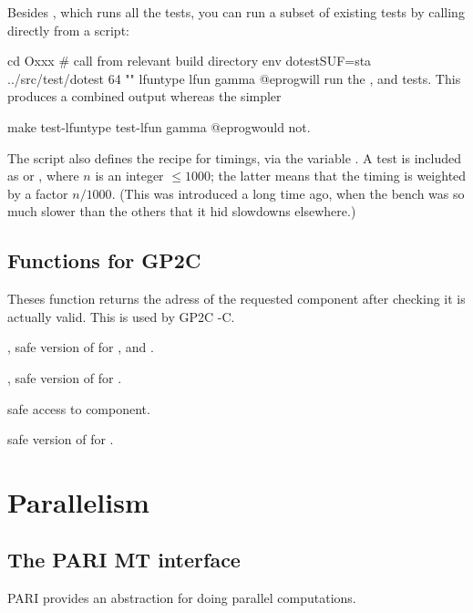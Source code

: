 \item Besides , which runs all the tests, you can run a
subset of existing tests by calling  directly from a script:

\bprog
  cd Oxxx     # call from relevant build directory
  env dotestSUF=sta ../src/test/dotest 64 "" lfuntype lfun gamma
@eprog\noindent will run the ,  and  tests.
This produces a combined output whereas the simpler

\bprog
  make test-lfuntype test-lfun gamma
@eprog\noindent would not.

\item The  script also defines the recipe for
 timings, via the variable . A test is
included as  or , where $n$ is an integer $\leq 1000$;
the latter means that the timing is weighted by a factor $n/1000$. (This was
introduced a long time ago, when the  bench was so much slower
than the others that it hid slowdowns elsewhere.)

\section{Functions for GP2C}


Theses function returns the adress of the requested component after checking
it is actually valid. This is used by GP2C -C.

, safe version of  for ,
 and .

, safe version of  for .

 safe access to  component.

 safe version of
 for .

\chapter{Parallelism}

\section{The PARI MT interface}

PARI provides an abstraction for doing parallel computations.

